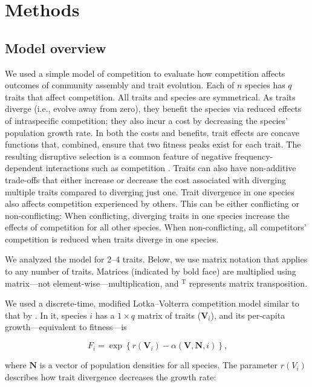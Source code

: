 
\section*{Methods}


\subsection*{Model overview}

We used a simple model of competition to evaluate how competition affects outcomes of
community assembly and trait evolution.
Each of $n$ species has $q$ traits that affect competition.
All traits and species are symmetrical.
As traits diverge (i.e., evolve away from zero), they benefit the species via reduced
effects of intraspecific competition;
they also incur a cost by decreasing the species' population growth rate.
In both the costs and benefits, trait effects are concave functions that,
combined, ensure that two fitness peaks exist for each trait.
The resulting disruptive selection is a common feature of
negative frequency-dependent interactions such as competition
\citep{Rosenzweig:1978bj,Doebeli:2000iq,Abrams:1993cr}.
Traits can also have non-additive trade-offs that either increase or decrease the cost
associated with diverging multiple traits compared to diverging just one.
Trait divergence in one species also affects competition experienced by others.
This can be either conflicting or non-conflicting:
When conflicting, diverging traits in one species increase the effects of competition
for all other species.
When non-conflicting, all competitors' competition is reduced when traits diverge in
one species.

We analyzed the model for 2--4 traits.
Below, we use matrix notation that applies to any number of traits.
Matrices (indicated by bold face) are multiplied using matrix---not
element-wise---multiplication, and
${}^{\text{T}}$ represents matrix transposition.

We used a discrete-time, modified Lotka--Volterra competition model similar to
that by \citet{Northfield:2013if}.
In it, species $i$ has a $1 \times q$ matrix of traits ($\mathbf{V}_i$), and
its per-capita growth---equivalent to fitness---is

\begin{equation} \label{eq:fitness}
    F_{i} = \exp \left\{ r(\mathbf{V}_i) -
        \alpha(\mathbf{V}, \mathbf{N}, i)
    \right\}\text{,}
\end{equation}


where $\mathbf{N}$ is a vector of population densities for
all species.
The parameter $r(V_i)$ describes how trait divergence decreases the growth rate:


